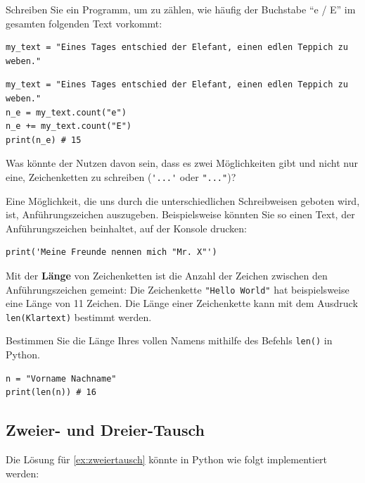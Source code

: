 \begin{myexercise}
Schreiben Sie ein Programm, um zu zählen, wie häufig der Buchstabe ``e / E'' im gesamten folgenden Text vorkommt:

\begin{lstlisting}
my_text = "Eines Tages entschied der Elefant, einen edlen Teppich zu weben."
\end{lstlisting}

\begin{myanswer}
\begin{lstlisting}
my_text = "Eines Tages entschied der Elefant, einen edlen Teppich zu weben."
n_e = my_text.count("e")
n_e += my_text.count("E")
print(n_e) # 15
\end{lstlisting}
\end{myanswer}
\end{myexercise}


\begin{mychallenge}
Was könnte der Nutzen davon sein, dass es zwei Möglichkeiten gibt und nicht nur eine, Zeichenketten zu schreiben (\lstinline|'...'| oder \lstinline|"..."|)?
\begin{myanswer}
Eine Möglichkeit, die uns durch die unterschiedlichen Schreibweisen geboten wird, ist, Anführungszeichen auszugeben. Beispielsweise könnten Sie so einen Text, der Anführungszeichen beinhaltet, auf der Konsole drucken:
\begin{lstlisting}
print('Meine Freunde nennen mich "Mr. X"')
\end{lstlisting}
\end{myanswer}
\end{mychallenge}

Mit der \textbf{Länge} von Zeichenketten ist die Anzahl der Zeichen zwischen den Anführungszeichen gemeint: Die Zeichenkette \lstinline|"Hello World"| hat beispielsweise eine Länge von 11 Zeichen. Die Länge einer Zeichenkette kann mit dem Ausdruck \lstinline|len(Klartext)| bestimmt werden.

\begin{myexercise}
	Bestimmen Sie die Länge Ihres vollen Namens mithilfe des Befehls \lstinline|len()| in Python.
\begin{lstlisting}[numbers=none]
n = "Vorname Nachname"
print(len(n)) # 16
\end{lstlisting}
\end{myexercise}

\subsection{Zweier- und Dreier-Tausch}
Die Lösung für \cref{ex:zweiertausch} könnte in Python wie folgt implementiert werden:


